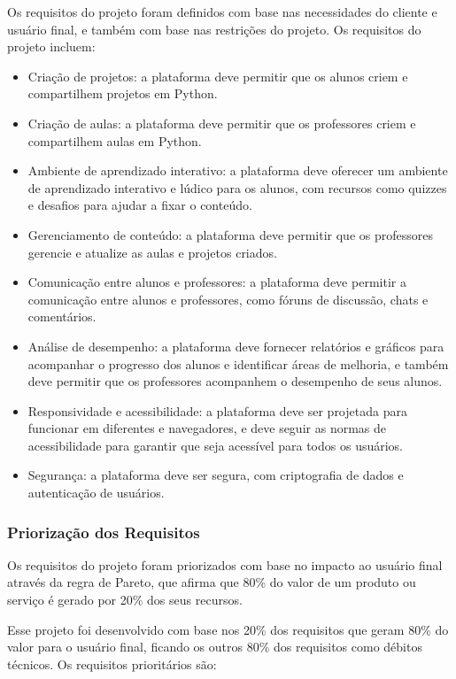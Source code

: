 Os requisitos do projeto foram definidos com base nas necessidades do cliente e usuário final, e também com base nas restrições do projeto. Os requisitos do projeto incluem:

\begin{itemize}
    \item Criação de projetos: a plataforma deve permitir que os alunos criem e compartilhem projetos em Python.
    \item Criação de aulas: a plataforma deve permitir que os professores criem e compartilhem aulas em Python.
    \item Ambiente de aprendizado interativo: a plataforma deve oferecer um ambiente de aprendizado interativo e lúdico para os alunos, com recursos como quizzes e desafios para ajudar a fixar o conteúdo.
    \item Gerenciamento de conteúdo: a plataforma deve permitir que os professores gerencie e atualize as aulas e projetos criados.
    \item Comunicação entre alunos e professores: a plataforma deve permitir a comunicação entre alunos e professores, como fóruns de discussão, chats e comentários.
    \item Análise de desempenho: a plataforma deve fornecer relatórios e gráficos para acompanhar o progresso dos alunos e identificar áreas de melhoria, e também deve permitir que os professores acompanhem o desempenho de seus alunos.
    \item Responsividade e acessibilidade: a plataforma deve ser projetada para funcionar em diferentes e navegadores, e deve seguir as normas de acessibilidade para garantir que seja acessível para todos os usuários.
    \item Segurança: a plataforma deve ser segura, com criptografia de dados e autenticação de usuários.
\end{itemize}

\subsubsection{Priorização dos Requisitos}

Os requisitos do projeto foram priorizados com base no impacto ao usuário final através da regra de Pareto, que afirma que 80\% do valor de um produto ou serviço é gerado por 20\% dos seus recursos. \cite{Xavier2009}

Esse projeto foi desenvolvido com base nos 20\% dos requisitos que geram 80\% do valor para o usuário final, ficando os outros 80\% dos requisitos como débitos técnicos. Os requisitos prioritários são:

